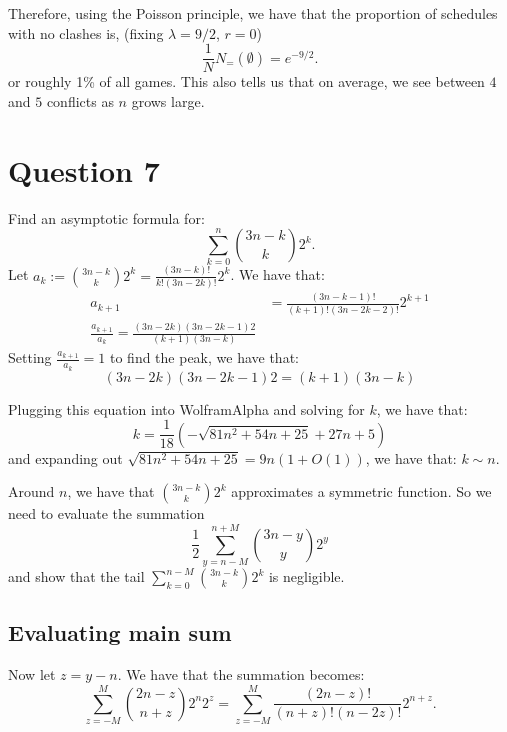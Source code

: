 \documentclass[]{article}
\theoremstyle{definition}
\numberwithin{theorem}{section}
\numberwithin{equation}{section}
\begin{document}
Therefore, using the Poisson principle, we have that the proportion of schedules with no clashes is, (fixing $\lambda = 9/2$, $r = 0$)
\begin{equation}
	\frac{1}{N} N_=(\emptyset) = e^{-9/2}.
\end{equation}
or roughly 1\% of all games.
This also tells us that on average, we see between $4$ and $5$ conflicts as $n$ grows large. 

\section{Question 7}
Find an asymptotic formula for:
\begin{equation}
	\sum_{k = 0}^n \binom{3n - k}{k} 2^k.
\end{equation}
Let $a_k := \binom{3n - k}{k} 2^k = \frac{(3n - k)!}{k! (3n - 2k)!} 2^k$.
We have that:
\begin{align*}
	a_{k + 1} &= \frac{(3n - k - 1)!}{(k + 1)! (3n - 2k - 2)!} 2^{k + 1}\\
	\frac{a_{k + 1}}{a_k} = \frac{(3n - 2k)(3n - 2k - 1) 2}{(k + 1)(3n - k)}
\end{align*}
Setting $\frac{a_{k + 1}}{a_k} = 1$ to find the peak, we have that:
\begin{equation}
	(3n - 2k)(3n - 2k - 1) 2 = (k + 1)(3n - k)
\end{equation}

Plugging this equation into WolframAlpha and solving for $k$, we have that:
\begin{equation}
	k = \frac{1}{18}\left(- \sqrt{81 n^2 + 54 n + 25} + 27 n + 5\right)
\end{equation}
and expanding out $\sqrt{81 n^2 + 54 n + 25} = 9 n(1 + O(1))$, we have that:
$k \sim n$. 

Around $n$, we have that $\binom{3n - k}{k} 2^k$ approximates a symmetric function. So we need to evaluate the summation
\begin{equation}
	\frac{1}{2}\sum_{y = n - M}^{n + M} \binom{3n - y}{y} 2^y
\end{equation}
and show that the tail $\sum_{k = 0}^{n - M} \binom{3n - k}{k} 2^k$ is negligible.

\subsection{Evaluating main sum}
Now let $z = y - n$. We have that the summation becomes:
\begin{equation}
	\sum_{z = -M}^M \binom{2n - z}{n + z} 2^n 2^z = \sum_{z = -M}^M\frac{(2n - z)!}{(n + z)! (n - 2z)!} 2^{n + z}. 
\end{equation}
\end{document}
